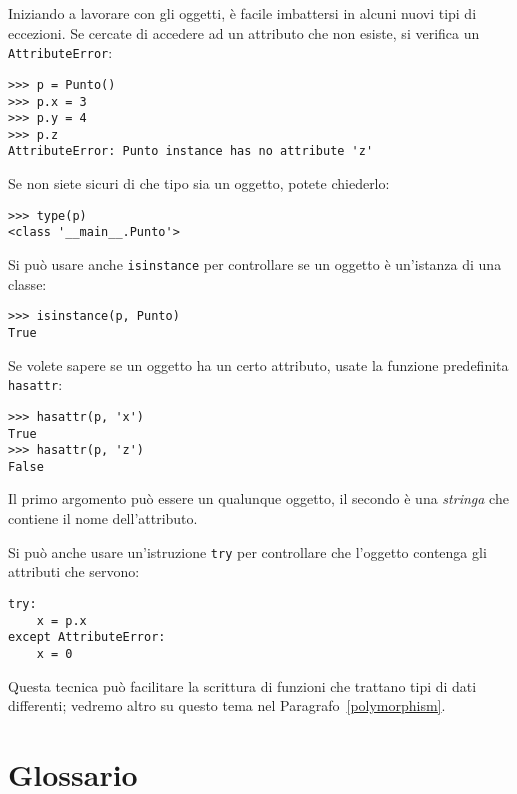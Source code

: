 \documentclass[10pt]{book}
\begin{document}
Iniziando a lavorare con gli oggetti, è facile imbattersi in alcuni nuovi tipi di eccezioni. Se cercate di accedere ad un attributo che non esiste, si verifica un {\tt AttributeError}:

\begin{verbatim}
>>> p = Punto()
>>> p.x = 3
>>> p.y = 4
>>> p.z
AttributeError: Punto instance has no attribute 'z'
\end{verbatim}
%
Se non siete sicuri di che tipo sia un oggetto, potete chiederlo:

\begin{verbatim}
>>> type(p)
<class '__main__.Punto'>
\end{verbatim}
%
Si può usare anche {\tt isinstance} per controllare se un oggetto è un'istanza di una classe:

\begin{verbatim}
>>> isinstance(p, Punto)
True
\end{verbatim}
%
Se volete sapere se un oggetto ha un certo attributo, usate la funzione predefinita {\tt hasattr}:

\begin{verbatim}
>>> hasattr(p, 'x')
True
>>> hasattr(p, 'z')
False
\end{verbatim}
%
Il primo argomento può essere un qualunque oggetto, il secondo è una {\em
stringa} che contiene il nome dell'attributo.

Si può anche usare un'istruzione {\tt try} per controllare che l'oggetto contenga gli attributi che servono:

\begin{verbatim}
try:
    x = p.x
except AttributeError:
    x = 0
\end{verbatim}

Questa tecnica può facilitare la scrittura di funzioni che trattano tipi di dati differenti; vedremo altro su questo tema nel Paragrafo~\ref{polymorphism}.

\section{Glossario}
\end{document}
